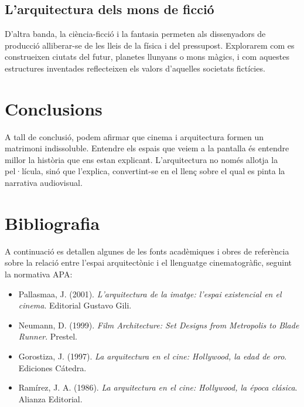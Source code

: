 \documentclass[11pt, a4paper]{report}
\begin{document}
\section{L'arquitectura dels mons de ficció}
D'altra banda, la ciència-ficció i la fantasia permeten als dissenyadors de producció alliberar-se de les lleis de la física i del pressupost. Explorarem com es construeixen ciutats del futur, planetes llunyans o mons màgics, i com aquestes estructures inventades reflecteixen els valors d'aquelles societats fictícies.

\chapter{Conclusions}
A tall de conclusió, podem afirmar que cinema i arquitectura formen un matrimoni indissoluble. Entendre els espais que veiem a la pantalla és entendre millor la història que ens estan explicant. L'arquitectura no només allotja la pel·lícula, sinó que l'explica, convertint-se en el llenç sobre el qual es pinta la narrativa audiovisual.

\chapter*{Bibliografia}

A continuació es detallen algunes de les fonts acadèmiques i obres de referència sobre la relació entre l'espai arquitectònic i el llenguatge cinematogràfic, seguint la normativa APA:

\begin{itemize}
    \item Pallasmaa, J. (2001). \textit{L'arquitectura de la imatge: l'espai existencial en el cinema}. Editorial Gustavo Gili.
    
    \item Neumann, D. (1999). \textit{Film Architecture: Set Designs from Metropolis to Blade Runner}. Prestel.
    
    \item Gorostiza, J. (1997). \textit{La arquitectura en el cine: Hollywood, la edad de oro}. Ediciones Cátedra.
    
    \item Ramírez, J. A. (1986). \textit{La arquitectura en el cine: Hollywood, la época clásica}. Alianza Editorial.
\end{itemize}
\end{document}
